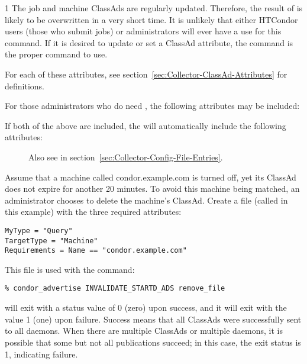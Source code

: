 \begin{ManPage}{\label{man-condor-advertise}}{1}
\GenRem
The job and machine ClassAds are regularly updated.
Therefore, the result of  is likely to be
overwritten in a very short time.
It is unlikely that either HTCondor users (those who submit jobs)
or administrators will ever have a use for this command.
If it is desired to update or set a ClassAd attribute, the
 command is the proper command to use.

For each of these attributes, 
see section~\ref{sec:Collector-ClassAd-Attributes} for definitions.


For those administrators who do need , the following
attributes may be included:

\begin{description}
\item[]
\item[]
\end{description}

If both of the above are included, the  will
automatically include the following attributes:

\begin{description}
\item[]
\item[]
\item[]
\item[] Also see 
  in section~\ref{sec:Collector-Config-File-Entries}.
\end{description}

\Examples

Assume that a machine called condor.example.com is turned off,
yet its  ClassAd does not expire for another 20 minutes.
To avoid this machine being matched, an administrator chooses
to delete the machine's  ClassAd.
Create a file (called  in this example)
with the three required attributes:
\begin{verbatim}
MyType = "Query"
TargetType = "Machine"
Requirements = Name == "condor.example.com"
\end{verbatim}

This file is used with the command:
\begin{verbatim}
% condor_advertise INVALIDATE_STARTD_ADS remove_file 
\end{verbatim}

\ExitStatus

 will exit with a status value of 0 (zero) upon
success, and it will exit with the value 1 (one) upon failure.
Success means that all ClassAds were successfully sent to all 
 daemons.
When there are multiple ClassAds or multiple  daemons,
it is possible that some but not all publications succeed;
in this case, the exit status is 1, indicating failure.

\end{ManPage}

